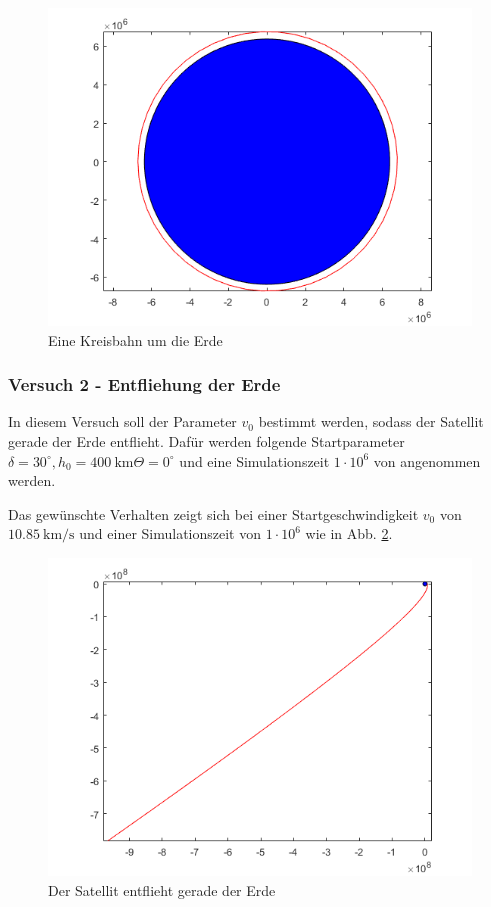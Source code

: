 \documentclass[]{scrartcl}
\begin{document}
\begin{figure}[H]
\centering
\includegraphics[width=1\linewidth]{./1_kreisbahn}
\caption{Eine Kreisbahn um die Erde}
\label{fig:1_Kreisbahn}
\end{figure}


\subsubsection{Versuch 2 - Entfliehung der Erde}
In diesem Versuch soll der Parameter $v_0$ bestimmt werden, sodass der Satellit gerade der Erde entflieht. Dafür werden folgende Startparameter 
 $\delta = 30^\circ, h_0 = \SI{400}{\km} \Theta = 0^\circ $ und eine Simulationszeit $1 \cdot 10^6$ von angenommen werden.
 
 Das gewünschte Verhalten zeigt sich bei einer Startgeschwindigkeit $v_0$ von $ \SI[per-mode=fraction]{10,85}{\km\per\second}$ und einer Simulationszeit von $1 \cdot 10^6$ wie in Abb. \ref{fig:1_Entfliehung}.
 
\begin{figure}[H]
\centering
\includegraphics[width=1\linewidth]{./1_entfliehung}
\caption{Der Satellit entflieht gerade der Erde}
\label{fig:1_Entfliehung}
\end{figure} 
\end{document}
